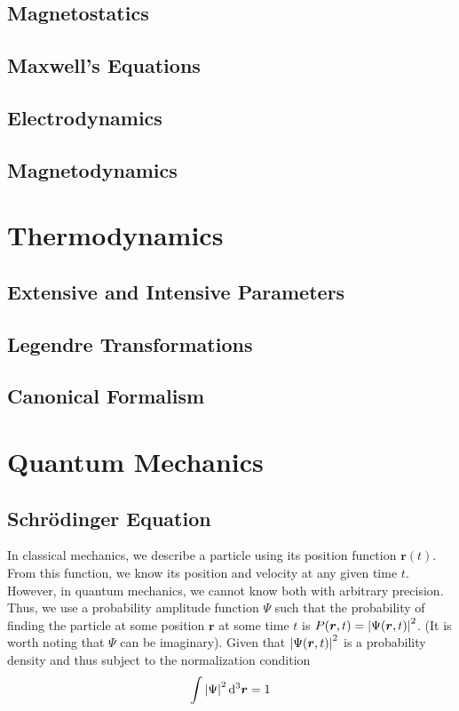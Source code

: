\documentclass[oneside]{book}
\numberwithin{figure}{section}
\numberwithin{equation}{section}
\theoremstyle{definition}
\begin{document}
	\section{Magnetostatics}
	\section{Maxwell's Equations}
	\section{Electrodynamics}
	\section{Magnetodynamics}

	\chapter{Thermodynamics}
	\section{Extensive and Intensive Parameters}
	\section{Legendre Transformations}
	\section{Canonical Formalism}

	\chapter{Quantum Mechanics}
	\section{Schrödinger Equation}
	In classical mechanics, we describe a particle using its position function $ \bm{r}(t) $. From this function, we know its position and velocity at any given time $ t $. However, in quantum mechanics, we cannot know both with arbitrary precision. Thus, we use a probability amplitude function $ \Psi $ such that the probability of finding the particle at some position $ \bm{r} $ at some time $ t $ is $ P(\bm{r},t) = \abs{\Psi(\bm{r},t)}^2 $. (It is worth noting that $ \Psi $ can be imaginary). Given that $ \abs{\Psi(\bm{r},t)}^2 $ is a probability density and thus subject to the normalization condition
	\begin{equation}
		\int\abs{\Psi}^2\dd[3]{\bm{r}} = 1
	\end{equation}
	
\end{document}

